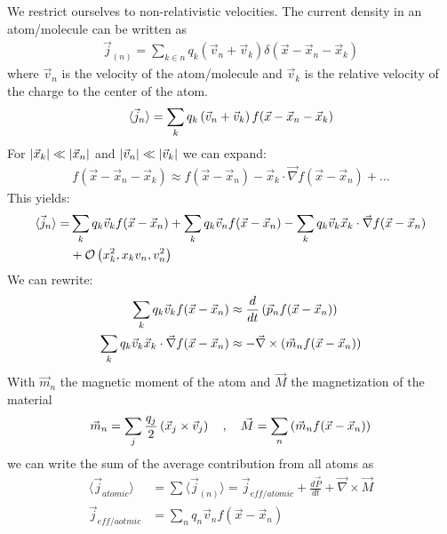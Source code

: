 We restrict ourselves to non-relativistic velocities. The current density in an
atom/molecule can be written as
\begin{align*}
    \vec{j}_{(n)} = \sum_{k \in n} q_k (\vec{v}_n + \vec{v}_k) \delta(\vec{x} - \vec{x}_n - \vec{x}_k)
\end{align*}
where $\vec{v}_n$ is the velocity of the atom/molecule and $\vec{v}_k$ is the
relative velocity of the charge to the center of the atom.
\begin{align*}
    \langle \vec{j}_n \rangle = \sum_k q_k \left( \vec{v}_n + \vec{v}_k \right)
    f(\vec{x} - \vec{x}_n - \vec{x}_k)
\end{align*}
For $\left\vert \vec{x}_k \right\vert \ll \left\vert \vec{x}_n \right\vert$ and $\left\vert \vec{v}_n \right\vert \ll \left\vert \vec{v}_k \right\vert$
we can expand:
\begin{align*}
    f(\vec{x} - \vec{x}_n - \vec{x}_k) \approx
    f(\vec{x} - \vec{x}_n) - \vec{x}_k \cdot \vec{\nabla} f(\vec{x} - \vec{x}_n) + \dots
\end{align*}
This yields:
\begin{align*}
    \langle \vec{j}_n \rangle = &\sum_k q_k \vec{v}_k f(\vec{x} - \vec{x}_n)
    + \sum_k q_k \vec{v}_n f(\vec{x} - \vec{x}_n) - \sum_k q_k \vec{v}_k \vec{x}_k \cdot \vec{\nabla} f(\vec{x} - \vec{x}_n)
    \\
    &+ \mathcal{O} \left( x_k^2 , x_k v_n , v_n^2 \right)
\end{align*}
We can rewrite:
\begin{align*}
    \sum_k q_k \vec{v}_k f(\vec{x} - \vec{x}_n)
    &\approx \frac{d}{dt} \left( \vec{p}_n f(\vec{x} - \vec{x}_n) \right)
    \\
    \sum_k q_k \vec{v}_k \vec{x}_k \cdot \vec{\nabla} f(\vec{x} - \vec{x}_n)
    &\approx - \vec{\nabla} \times \left( \vec{m}_n f(\vec{x} - \vec{x}_n) \right)
\end{align*}
With $\vec{m}_n$ the magnetic moment of the atom and $\vec{M}$ the magnetization
of the material
\begin{align*}
    \vec{m}_n = \sum_j \frac{q_j}{2} \left( \vec{x}_j \times \vec{v}_j \right)
    \hspace{10pt} , \hspace{10pt}
    \vec{M} = \sum_n \left( \vec{m}_n f(\vec{x} - \vec{x}_n) \right)
\end{align*}
we can write the sum of the average contribution from all atoms as
\begin{align*}
    \langle \vec{j}_{atomic} \rangle &= \sum \langle \vec{j}_{(n)} \rangle
    = \vec{j}_{eff/atomic} + \frac{d \vec{P}}{dt} + \vec{\nabla} \times \vec{M}
    \\
    \vec{j}_{eff/aotmic} &= \sum_n q_n \vec{v}_n f(\vec{x} - \vec{x}_n)
\end{align*}

